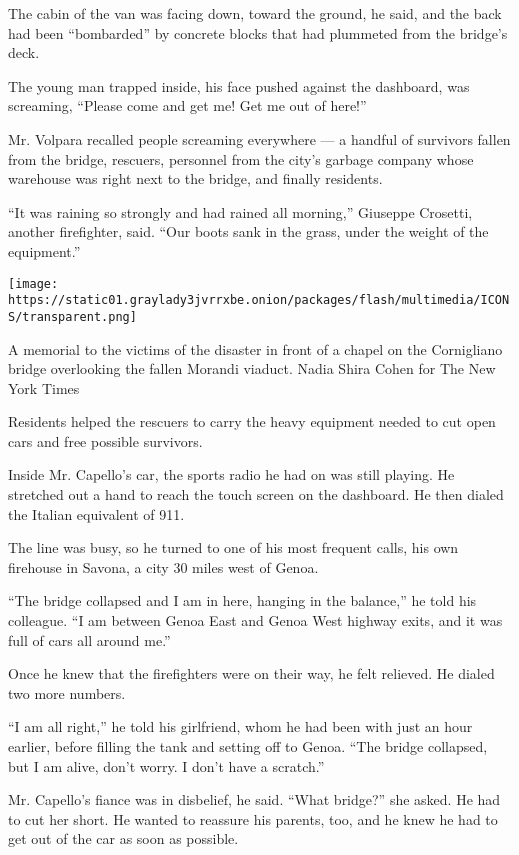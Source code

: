 The cabin of the van was facing down, toward the ground, he said, and
the back had been ``bombarded'' by concrete blocks that had plummeted
from the bridge's deck.

The young man trapped inside, his face pushed against the dashboard, was
screaming, ``Please come and get me! Get me out of here!''

Mr. Volpara recalled people screaming everywhere --- a handful of
survivors fallen from the bridge, rescuers, personnel from the city's
garbage company whose warehouse was right next to the bridge, and
finally residents.

``It was raining so strongly and had rained all morning,'' Giuseppe
Crosetti, another firefighter, said. ``Our boots sank in the grass,
under the weight of the equipment.''

\texttt{[image: https://static01.graylady3jvrrxbe.onion/packages/flash/multimedia/ICONS/transparent.png]}

A memorial to the victims of the disaster in front of a chapel on the
Cornigliano bridge overlooking the fallen Morandi viaduct. Nadia Shira
Cohen for The New York Times

Residents helped the rescuers to carry the heavy equipment needed to cut
open cars and free possible survivors.

Inside Mr. Capello's car, the sports radio he had on was still playing.
He stretched out a hand to reach the touch screen on the dashboard. He
then dialed the Italian equivalent of 911.

The line was busy, so he turned to one of his most frequent calls, his
own firehouse in Savona, a city 30 miles west of Genoa.

``The bridge collapsed and I am in here, hanging in the balance,'' he
told his colleague. ``I am between Genoa East and Genoa West highway
exits, and it was full of cars all around me.''

Once he knew that the firefighters were on their way, he felt relieved.
He dialed two more numbers.

``I am all right,'' he told his girlfriend, whom he had been with just
an hour earlier, before filling the tank and setting off to Genoa. ``The
bridge collapsed, but I am alive, don't worry. I don't have a scratch.''

Mr. Capello's fiance was in disbelief, he said. ``What bridge?'' she
asked. He had to cut her short. He wanted to reassure his parents, too,
and he knew he had to get out of the car as soon as possible.

